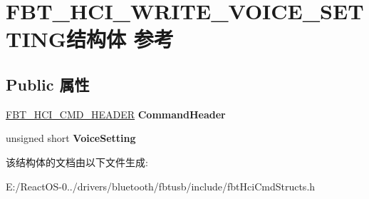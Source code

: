 \hypertarget{struct_f_b_t___h_c_i___w_r_i_t_e___v_o_i_c_e___s_e_t_t_i_n_g}{}\section{F\+B\+T\+\_\+\+H\+C\+I\+\_\+\+W\+R\+I\+T\+E\+\_\+\+V\+O\+I\+C\+E\+\_\+\+S\+E\+T\+T\+I\+N\+G结构体 参考}
\label{struct_f_b_t___h_c_i___w_r_i_t_e___v_o_i_c_e___s_e_t_t_i_n_g}
\subsection*{Public 属性}
\begin{DoxyCompactItemize}
\item 
\mbox{\label{struct_f_b_t___h_c_i___w_r_i_t_e___v_o_i_c_e___s_e_t_t_i_n_g_a73868f0eceb3f91f3d3f8f96f9283bc8}} 
\hyperlink{struct_f_b_t___h_c_i___c_m_d___h_e_a_d_e_r}{F\+B\+T\+\_\+\+H\+C\+I\+\_\+\+C\+M\+D\+\_\+\+H\+E\+A\+D\+ER} {\bfseries Command\+Header}
\item 
\mbox{\label{struct_f_b_t___h_c_i___w_r_i_t_e___v_o_i_c_e___s_e_t_t_i_n_g_a4ec0a426fd8d81f5ef711d4c3eec2984}} 
unsigned short {\bfseries Voice\+Setting}
\end{DoxyCompactItemize}


该结构体的文档由以下文件生成\+:\begin{DoxyCompactItemize}
\item 
E\+:/\+React\+O\+S-\/0../drivers/bluetooth/fbtusb/include/fbt\+Hci\+Cmd\+Structs.\+h\end{DoxyCompactItemize}
